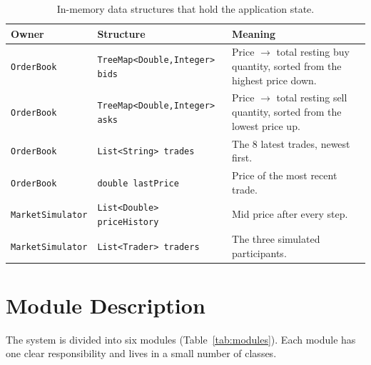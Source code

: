\documentclass[12pt,a4paper,openany,oneside]{report}
\newcommand{\code}[1]{\texttt{#1}}
\begin{document}
\begin{table}[H]
\centering\small
\caption{In-memory data structures that hold the application state.}
\label{tab:state}
\begin{tabular}{@{}L{3.1cm} L{4.5cm} L{7.2cm}@{}}
\toprule
\textbf{Owner} & \textbf{Structure} & \textbf{Meaning}\\
\midrule
\code{OrderBook} & \code{TreeMap<Double,Integer> bids} & Price $\rightarrow$ total resting buy quantity, sorted from the highest price down.\\
\code{OrderBook} & \code{TreeMap<Double,Integer> asks} & Price $\rightarrow$ total resting sell quantity, sorted from the lowest price up.\\
\code{OrderBook} & \code{List<String> trades} & The 8 latest trades, newest first.\\
\code{OrderBook} & \code{double lastPrice} & Price of the most recent trade.\\
\code{MarketSimulator} & \code{List<Double> priceHistory} & Mid price after every step.\\
\code{MarketSimulator} & \code{List<Trader> traders} & The three simulated participants.\\
\bottomrule
\end{tabular}
\end{table}

\section{Module Description}

The system is divided into six modules (Table~\ref{tab:modules}). Each module has one clear responsibility and lives in a small number of classes.
\end{document}
